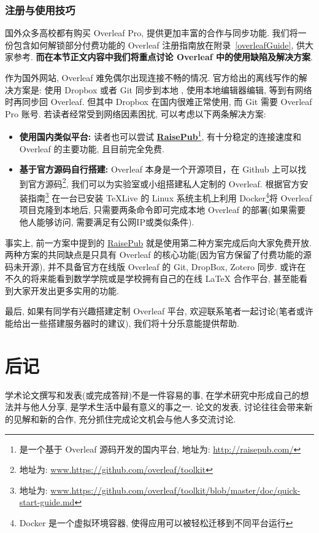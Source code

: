 \documentclass{booki}
\begin{document}
\subsection{注册与使用技巧}
{国外众多高校都有购买 Overleaf Pro, 提供更加丰富的合作与同步功能. 我们将一份包含如何解锁部分付费功能的 Overleaf 注册指南放在附录~\ref{overleafGuide}, 供大家参考. \textbf{而在本节正文内容中我们将重点讨论 Overleaf 中的使用缺陷及解决方案}}.

{作为国外网站, Overleaf 难免偶尔出现连接不畅的情况. 官方给出的离线写作的解决方案是: 使用 Dropbox 或者 Git 同步到本地 , 使用本地编辑器编辑, 等到有网络时再同步回 Overleaf. 但其中 Dropbox 在国内很难正常使用, 而 Git 需要 Overleaf Pro 账号. 若读者经常受到网络因素困扰, 可以考虑以下两条解决方案:}

\begin{itemize}
    \item {\textbf{使用国内类似平台:} 读者也可以尝试 \textbf{\href{http://raisepub.com/}{RaisePub}}\footnote{是一个基于 Overleaf 源码开发的国内平台, 地址为: \url{http://raisepub.com/}}, 有十分稳定的连接速度和 Overleaf 的主要功能, 且目前完全免费.}
    \item {\textbf{基于官方源码自行搭建:} Overleaf 本身是一个开源项目，在 Github 上可以找到官方源码\footnote{地址为: \url{www.https://github.com/overleaf/toolkit}}, 我们可以为实验室或小组搭建私人定制的 Overleaf. 根据官方安装指南\footnote{地址为: \url{www.https://github.com/overleaf/toolkit/blob/master/doc/quick-start-guide.md}} 在一台已安装 TeXLive 的 Linux 系统主机上利用 Docker\footnote{Docker 是一个虚拟环境容器, 使得应用可以被轻松迁移到不同平台运行}将 Overleaf 项目克隆到本地后, 只需要两条命令即可完成本地 Overleaf 的部署(如果需要他人能够访问, 需要满足有公网IP或类似条件).}
\end{itemize}

{事实上, 前一方案中提到的 \href{http://raisepub.com/}{RaisePub} 就是使用第二种方案完成后向大家免费开放. 两种方案的共同缺点是只具有 Overleaf 的核心功能(因为官方保留了付费功能的源码未开源), 并不具备官方在线版 Overleaf 的 Git, DropBox, Zotero 同步. 或许在不久的将来能看到数学学院或是学校拥有自己的在线 LaTeX 合作平台, 甚至能看到大家开发出更多实用的功能. }

{最后, 如果有同学有兴趣搭建定制 Overleaf 平台, 欢迎联系笔者一起讨论(笔者或许能给出一些搭建服务器时的建议), 我们将十分乐意能提供帮助.}

\chapter{后记}
学术论文撰写和发表(或完成答辩)不是一件容易的事, 在学术研究中形成自己的想法并与他人分享, 是学术生活中最有意义的事之一. 论文的发表, 讨论往往会带来新的见解和新的合作, 充分抓住完成论文机会与他人多交流讨论.
\end{document}
